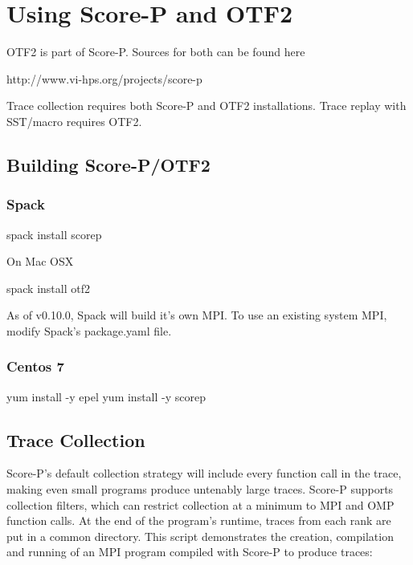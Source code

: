 
\section{Using Score-P and OTF2}
\label{sec:tutorial:otf}

OTF2 is part of Score-P. Sources for both can be found here 
\begin{ViFile}
http://www.vi-hps.org/projects/score-p
\end{ViFile}


Trace collection requires both Score-P and OTF2 installations. Trace replay with SST/macro requires OTF2.

\subsection{Building Score-P/OTF2}
\label{subset:otf:build}
\subsubsection{Spack}
\begin{ViFile}
spack install scorep
\end{ViFile}
On Mac OSX
\begin{ViFile}
spack install otf2
\end{ViFile}
As of v0.10.0, Spack will build it's own MPI. To use an existing system MPI, modify Spack's package.yaml file.
\subsubsection{Centos 7}
\begin{ViFile}
yum install -y epel
yum install	-y scorep
\end{ViFile}


\subsection{Trace Collection}
\label{subsec:otf:traceCollection}
Score-P's default collection strategy will include every function call in the trace, making even small programs produce untenably large traces. Score-P supports collection filters, which can restrict collection at a minimum to MPI and OMP function calls. At the end of the program's runtime, traces from each rank are put in a common directory. This script demonstrates the creation, compilation and running of an MPI program compiled with Score-P to produce traces:

